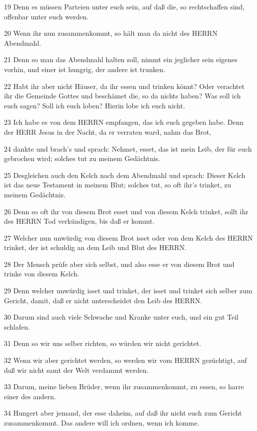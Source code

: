 \par 19 Denn es müssen Parteien unter euch sein, auf daß die, so rechtschaffen sind, offenbar unter euch werden.
\par 20 Wenn ihr nun zusammenkommt, so hält man da nicht des HERRN Abendmahl.
\par 21 Denn so man das Abendmahl halten soll, nimmt ein jeglicher sein eigenes vorhin, und einer ist hungrig, der andere ist trunken.
\par 22 Habt ihr aber nicht Häuser, da ihr essen und trinken könnt? Oder verachtet ihr die Gemeinde Gottes und beschämet die, so da nichts haben? Was soll ich euch sagen? Soll ich euch loben? Hierin lobe ich euch nicht.
\par 23 Ich habe es von dem HERRN empfangen, das ich euch gegeben habe. Denn der HERR Jesus in der Nacht, da er verraten ward, nahm das Brot,
\par 24 dankte und brach's und sprach: Nehmet, esset, das ist mein Leib, der für euch gebrochen wird; solches tut zu meinem Gedächtnis.
\par 25 Desgleichen auch den Kelch nach dem Abendmahl und sprach: Dieser Kelch ist das neue Testament in meinem Blut; solches tut, so oft ihr's trinket, zu meinem Gedächtnis.
\par 26 Denn so oft ihr von diesem Brot esset und von diesem Kelch trinket, sollt ihr des HERRN Tod verkündigen, bis daß er kommt.
\par 27 Welcher nun unwürdig von diesem Brot isset oder von dem Kelch des HERRN trinket, der ist schuldig an dem Leib und Blut des HERRN.
\par 28 Der Mensch prüfe aber sich selbst, und also esse er von diesem Brot und trinke von diesem Kelch.
\par 29 Denn welcher unwürdig isset und trinket, der isset und trinket sich selber zum Gericht, damit, daß er nicht unterscheidet den Leib des HERRN.
\par 30 Darum sind auch viele Schwache und Kranke unter euch, und ein gut Teil schlafen.
\par 31 Denn so wir uns selber richten, so würden wir nicht gerichtet.
\par 32 Wenn wir aber gerichtet werden, so werden wir vom HERRN gezüchtigt, auf daß wir nicht samt der Welt verdammt werden.
\par 33 Darum, meine lieben Brüder, wenn ihr zusammenkommt, zu essen, so harre einer des andern.
\par 34 Hungert aber jemand, der esse daheim, auf daß ihr nicht euch zum Gericht zusammenkommt. Das andere will ich ordnen, wenn ich komme.

